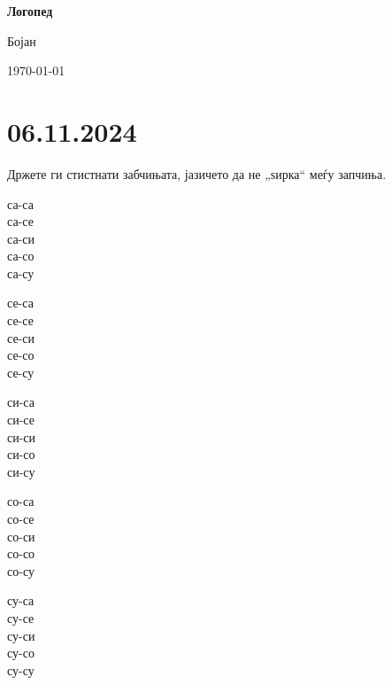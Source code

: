 \documentclass[a5paper,12pt]{article}
\newenvironment{instruction}{%
  \begin{tcolorbox}[colback=white,colframe=accentcolor,title={\textbf{Инструкции}},fonttitle=\bfseries] 
}{%
  \end{tcolorbox}
}
\begin{document}
\begin{titlepage}
\centering
{\Large\textcolor{titlecolor}{\textbf{Логопед}}\par} 
\vspace{1cm}
{\Huge\textcolor{accentcolor}{Бојан}\par} 
\vspace{2cm}


\vspace{1cm}
{\large\today\par}
\end{titlepage}

\tableofcontents
\newpage

\section{06.11.2024} 

\begin{instruction}
Држете ги стистнати забчињата, јазичето да не „ѕирка“ меѓу запчиња.
\end{instruction}

\noindent %
\begin{minipage}[t]{0.19\textwidth}
  са-са\\
  са-се\\
  са-си\\
  са-со\\
  са-су
\end{minipage}
\hfill 
\begin{minipage}[t]{0.19\textwidth}
  се-са\\
  се-се\\
  се-си\\
  се-со\\
  се-су
\end{minipage}
\hfill %
\begin{minipage}[t]{0.19\textwidth}
  си-са\\
  си-се\\
  си-си\\
  си-со\\
  си-су
\end{minipage}
\hfill %
\begin{minipage}[t]{0.19\textwidth}
  со-са\\
  со-се\\
  со-си\\
  со-со\\
  со-су
\end{minipage}
\hfill %
\begin{minipage}[t]{0.19\textwidth}
  су-са\\
  су-се\\
  су-си\\
  су-со\\
  су-су
\end{minipage}
\end{document}
